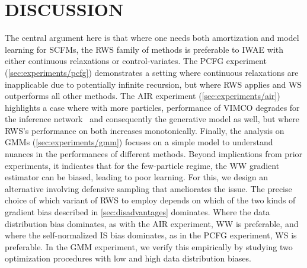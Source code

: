 
\section{DISCUSSION}
\label{sec:discussion}

The central argument here is that where one needs both amortization and model learning for \glspl{SCFM}, the \gls{RWS} family of methods is preferable to \gls{IWAE} with either continuous relaxations or control-variates.
%
The \gls{PCFG} experiment (\cref{sec:experiments/pcfg}) demonstrates a setting where continuous relaxations are inapplicable due to potentially infinite recursion, but where \gls{RWS} applies and \gls{WS} outperforms all other methods.
%
The \gls{AIR} experiment (\cref{sec:experiments/air}) highlights a case where with more particles, performance of \gls{VIMCO} degrades for the inference network~\citep{rainforth2018tighter} and consequently the generative model as well, but where \gls{RWS}'s performance on both increases monotonically.
%
Finally, the analysis on \glspl{GMM} (\cref{sec:experiments/gmm}) focuses on a simple model to understand nuances in the performances of different methods.
%
Beyond implications from prior experiments, it indicates that for the few-particle regime, the \gls{WW} gradient estimator can be biased, leading to poor learning.
%
%
For this, we design an alternative involving defensive sampling that ameliorates the issue.
%
The precise choice of which variant of \gls{RWS} to employ depends on which of the two kinds of gradient bias described in \cref{sec:disadvantages} dominates.
%
Where the data distribution bias dominates, as with the \gls{AIR} experiment, \gls{WW} is preferable, and where the self-normalized \gls{IS} bias dominates, as in the \gls{PCFG} experiment, \gls{WS} is preferable.
In the \gls{GMM} experiment, we verify this empirically by studying two optimization procedures with low and high data distribution biases.


